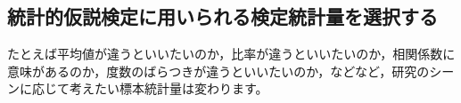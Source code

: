 \documentclass{ltjsbook}
\begin{document}




\subsection{統計的仮説検定に用いられる検定統計量を選択する}
たとえば平均値が違うといいたいのか，比率が違うといいたいのか，相関係数に意味があるのか，度数のばらつきが違うといいたいのか，などなど，研究のシーンに応じて考えたい標本統計量は変わります。
\end{document}
